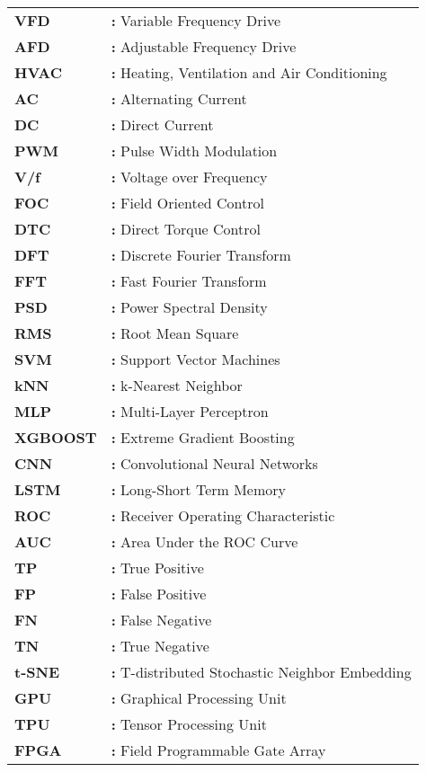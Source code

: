 \begin{tabular}{@{}p{2cm}l}
{\bf{VFD}} & {\bf:} Variable Frequency Drive\\
{\bf AFD} & {\bf:} Adjustable Frequency Drive\\
{\bf HVAC} & {\bf:} Heating, Ventilation and Air Conditioning\\
{\bf AC} & {\bf:} Alternating Current\\
{\bf DC} & {\bf:} Direct Current\\
{\bf PWM} & {\bf:} Pulse Width Modulation\\
{\bf V/f} & {\bf:} Voltage over Frequency\\
{\bf FOC} & {\bf:} Field Oriented Control\\
{\bf DTC} & {\bf:} Direct Torque Control\\
{\bf DFT} & {\bf:} Discrete Fourier Transform\\
{\bf FFT} & {\bf:} Fast Fourier Transform\\
{\bf PSD} & {\bf:} Power Spectral Density\\
{\bf RMS} & {\bf:} Root Mean Square\\
{\bf SVM} & {\bf:} Support Vector Machines\\
{\bf kNN} & {\bf:} k-Nearest Neighbor\\
{\bf MLP} & {\bf:} Multi-Layer Perceptron\\
{\bf XGBOOST} & {\bf:} Extreme Gradient Boosting\\
{\bf CNN} & {\bf:} Convolutional Neural Networks\\
{\bf LSTM} & {\bf:} Long-Short Term Memory\\
{\bf ROC} & {\bf:} Receiver Operating Characteristic\\
{\bf AUC} & {\bf:}  Area Under the ROC Curve\\
{\bf TP} & {\bf:} True Positive\\
{\bf FP} & {\bf:} False Positive\\
{\bf FN} & {\bf:} False Negative\\
{\bf TN} & {\bf:} True Negative\\
{\bf t-SNE} & {\bf:} T-distributed Stochastic Neighbor Embedding\\
{\bf GPU} & {\bf:} Graphical Processing Unit\\
{\bf TPU} & {\bf:} Tensor Processing Unit\\
{\bf FPGA} & {\bf:} Field Programmable Gate Array\\
\end{tabular}

